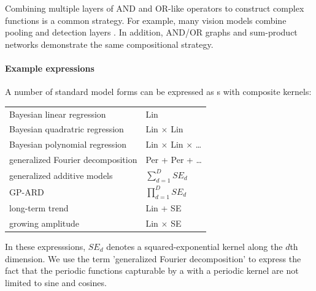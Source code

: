 \documentclass[twoside]{article}
\begin{document}
Combining multiple layers of AND and OR-like operators to construct complex functions is a common strategy.  For example, many vision models combine pooling and detection layers . In addition, AND/OR graphs  and sum-product networks  demonstrate the same compositional strategy.


\paragraph{Example expressions}

A number of standard model forms can be expressed as \gp s with composite kernels:

\begin{tabular}{l|l}
Bayesian linear regression & Lin \\
Bayesian quadratric regression & Lin $\times$ Lin \\
Bayesian polynomial regression & Lin $\times$ Lin $\times$ \dots\\
generalized Fourier decomposition & Per + Per + \dots \\
generalized additive models & $\sum_{d=1}^D SE_d$ \\
GP-ARD & $\prod_{d=1}^D SE_d$ \\
long-term trend & Lin + SE \\
growing amplitude & Lin $\times$ SE
\end{tabular}

In these expresssions, $SE_d$ denotes a squared-exponential kernel along the $d$th dimension.
We use the term 'generalized Fourier decomposition' to express the fact that the periodic functions capturable by a \gp{} with a periodic kernel are not limited to sine and cosines.



\end{document}
